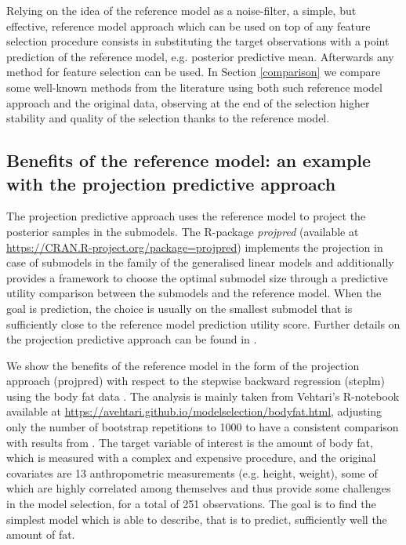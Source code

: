 \documentclass[american,]{article}
\theoremstyle{definition}
\begin{document}

Relying on the idea of the reference model as a noise-filter, a simple, but effective, reference model approach which can be used on top of any feature selection procedure consists in substituting the target observations with a point prediction of the reference model, e.g. posterior predictive mean. Afterwards any method for feature selection can be used. In Section \ref{comparison} we compare some well-known methods from the literature using both such reference model approach and the original data, observing at the end of the selection higher stability and quality of the selection thanks to the reference model.

\hypertarget{projection}{%
\subsection{Benefits of the reference model: an example with the projection predictive approach}\label{projection}}

The projection predictive approach uses the reference model to project the posterior samples in the submodels. The R-package \textit{projpred} (available at \url{https://CRAN.R-project.org/package=projpred}) implements the projection in case of submodels in the family of the generalised linear models and additionally provides a framework to choose the optimal submodel size through a predictive utility comparison between the submodels and the reference model. When the goal is prediction, the choice is usually on the smallest submodel that is sufficiently close to the reference model prediction utility score. Further details on the projection predictive approach can be found in \cite{paper:projpred}.

We show the benefits of the reference model in the form of the projection approach (projpred) with respect to the stepwise backward regression (steplm) using the body fat data \citep{paper:bodyfat_johnson}. The analysis is mainly taken from Vehtari's R-notebook available at \url{https://avehtari.github.io/modelselection/bodyfat.html}, adjusting only the number of bootstrap repetitions to 1000 to have a consistent comparison with results from \cite{paper:bodyfat}. The target variable of interest is the amount of body fat, which is measured with a complex and expensive procedure, and the original covariates are 13 anthropometric measurements (e.g. height, weight), some of which are highly correlated among themselves and thus provide some challenges in the model selection, for a total of 251 observations. The goal is to find the simplest model which is able to describe, that is to predict, sufficiently well the amount of fat. 
\end{document}
